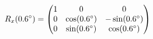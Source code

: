 \documentclass[preview]{standalone}
\begin{document}
\begin{align*}
\special{dvisvgm:raw <g id='unique000'>}R_x(0.6^\circ) = \begin{pmatrix} 1 & 0 & 0 \\ 0 & \cos(0.6^\circ) & -\sin(0.6^\circ) \\ 0 & \sin(0.6^\circ) & \cos(0.6^\circ) \end{pmatrix}\special{dvisvgm:raw </g>}
\end{align*}
\end{document}
